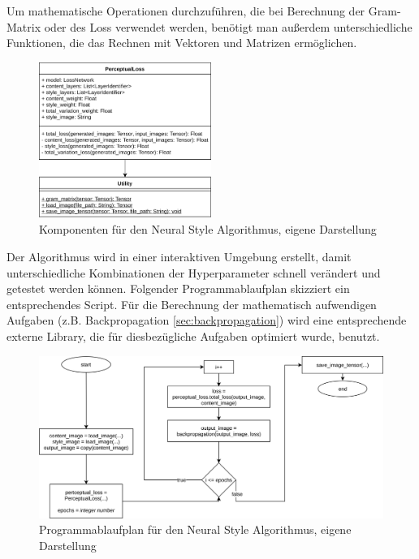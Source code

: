 Um mathematische Operationen durchzuführen, die bei Berechnung der Gram-Matrix oder des Loss verwendet werden, benötigt man außerdem unterschiedliche Funktionen, die das Rechnen mit Vektoren und Matrizen ermöglichen.


\begin{figure}[H]
	\centering
	\includegraphics[width=0.50\textwidth]{resources/content/neural_style_class_diagram.png}
	\caption{Komponenten für den Neural Style Algorithmus, eigene Darstellung}
	\label{img:neural_style_class_diagram_img}
\end{figure}

Der Algorithmus wird in einer interaktiven Umgebung erstellt, damit unterschiedliche Kombinationen der Hyperparameter schnell verändert und getestet werden können. Folgender Programmablaufplan skizziert ein entsprechendes Script. Für die Berechnung der mathematisch aufwendigen Aufgaben (z.B. Backpropagation \ref{sec:backpropagation}) wird eine entsprechende externe Library, die für diesbezügliche Aufgaben optimiert wurde, benutzt.

\begin{figure}[H]
	\centering
	\includegraphics[width=1.0\textwidth]{resources/content/neural_style_pap.png}
	\caption{Programmablaufplan für den Neural Style Algorithmus, eigene Darstellung}
	\label{img:neural_style_pap_img}
\end{figure}

